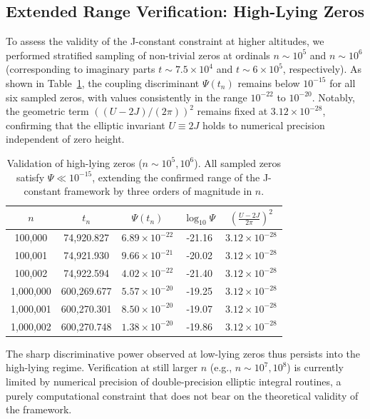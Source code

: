 \documentclass[11pt,a4paper]{article}
\theoremstyle{definition}
\begin{document}
\subsection{Extended Range Verification: High-Lying Zeros}

To assess the validity of the J-constant constraint at higher altitudes, we performed stratified sampling of non-trivial zeros at ordinals \(n \sim 10^5\) and \(n \sim 10^6\) (corresponding to imaginary parts \(t \sim 7.5 \times 10^4\) and \(t \sim 6 \times 10^5\), respectively). 
As shown in Table~\ref{tab:high_zeros}, the coupling discriminant \(\Psi(t_n)\) remains below \(10^{-15}\) for all six sampled zeros, with values consistently in the range \(10^{-22}\) to \(10^{-20}\). 
Notably, the geometric term \(\left((U-2J)/(2\pi)\right)^2\) remains fixed at \(3.12 \times 10^{-28}\), confirming that the elliptic invariant \(U \equiv 2J\) holds to numerical precision independent of zero height.

\begin{table}[h!]
\centering
\caption{Validation of high-lying zeros ($n \sim 10^5, 10^6$). All sampled zeros satisfy $\Psi \ll 10^{-15}$, extending the confirmed range of the J-constant framework by three orders of magnitude in $n$.}
\label{tab:high_zeros}
\begin{tabular}{ccccc}
\toprule
$n$ & $t_n$ & $\Psi(t_n)$ & $\log_{10}\Psi$ & $\left(\frac{U-2J}{2\pi}\right)^2$ \\
\midrule
100,000 & 74,920.827 & $6.89\times 10^{-22}$ & -21.16 & $3.12\times 10^{-28}$ \\
100,001 & 74,921.930 & $9.66\times 10^{-21}$ & -20.02 & $3.12\times 10^{-28}$ \\
100,002 & 74,922.594 & $4.02\times 10^{-22}$ & -21.40 & $3.12\times 10^{-28}$ \\
1,000,000 & 600,269.677 & $5.57\times 10^{-20}$ & -19.25 & $3.12\times 10^{-28}$ \\
1,000,001 & 600,270.301 & $8.50\times 10^{-20}$ & -19.07 & $3.12\times 10^{-28}$ \\
1,000,002 & 600,270.748 & $1.38\times 10^{-20}$ & -19.86 & $3.12\times 10^{-28}$ \\
\bottomrule
\end{tabular}
\end{table}

The sharp discriminative power observed at low-lying zeros thus persists into the high-lying regime. 
Verification at still larger \(n\) (e.g., \(n \sim 10^7, 10^8\)) is currently limited by numerical precision of double-precision elliptic integral routines, a purely computational constraint that does not bear on the theoretical validity of the framework.
\end{document}
